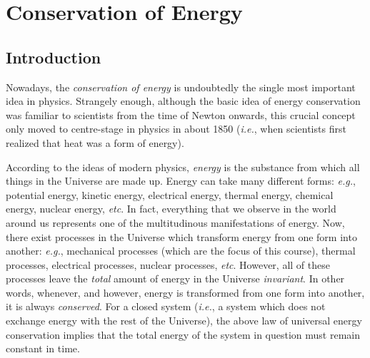 \section{Conservation of Energy}\label{senergy}
\subsection{Introduction}
Nowadays, the {\em conservation of energy} is undoubtedly the single most important idea in physics.
Strangely enough, although the basic idea of energy conservation was familiar to
scientists from the time of Newton onwards,
 this crucial concept only moved to centre-stage  in physics in about 1850 ({\em i.e.}, when
scientists first realized that heat was a form of energy).

According to the ideas of modern physics, {\em energy} is the substance from which
all things in the Universe are made up. Energy can take many different forms: {\em e.g.},
potential energy, kinetic energy, electrical energy, thermal energy, chemical
energy, nuclear energy, {\em etc}. In fact, everything that we observe in the
world around us represents one of the multitudinous manifestations of energy.
Now, there exist processes in the Universe which transform energy from one form
into another: {\em e.g.}, mechanical processes (which are the focus of this course), thermal
processes, electrical processes, nuclear processes, {\em etc}. However, all of
these processes leave the {\em total} amount of energy in the Universe {\em invariant}. In other words,
whenever, and however, energy is transformed from one form into another, it is always
{\em conserved}. For a closed system ({\em i.e.}, a system which does not exchange
energy with the rest of the Universe), the above law of universal energy conservation implies that the
total energy of the system in question must remain constant in time.

